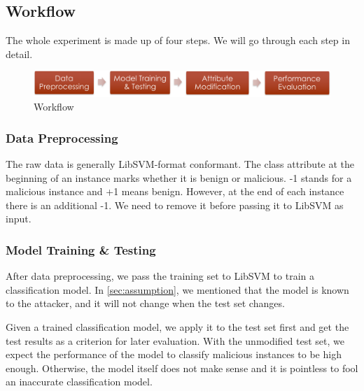 \documentclass[11pt]{article}
\begin{document}
\subsection{Workflow}
The whole experiment is made up of four steps. %
We will go through each step in detail.

\begin{figure}[htbp]
\label{fig:workflow}
\centering
\includegraphics*[width=\textwidth]{fig/workflow.png}
\caption{Workflow}
\end{figure}

\subsubsection{Data Preprocessing}
The raw data is generally LibSVM-format conformant. The class attribute at the beginning of an instance marks whether it is benign or malicious. -1 stands for a malicious instance and +1 means benign. However, at the end of each instance there is an additional -1. We need to remove it before passing it to LibSVM as input.

\subsubsection{Model Training \& Testing}
After data preprocessing, we pass the training set to LibSVM to train a classification model. In \ref{sec:assumption}, we mentioned that the model is known to the attacker, and it will not change when the test set changes. %

Given a trained classification model, we apply it to the test set first and get the test results as a criterion for later evaluation. With the unmodified test set, we expect the performance of the model to classify malicious instances to be high enough. Otherwise, the model itself does not make sense and it is pointless to fool an inaccurate classification model.
\end{document}
